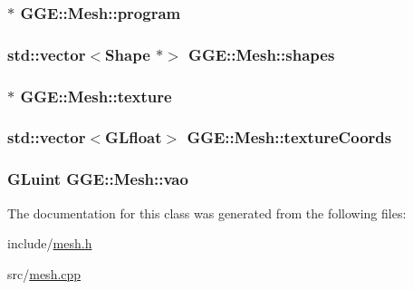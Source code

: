 \hypertarget{class_g_g_e_1_1_mesh_aee3bd238788ee7380e8d6770d5f29f2c}{
\subsubsection[{program}]{$\ast$ G\+G\+E\+::\+Mesh\+::program\hspace{0.3cm}{\ttfamily [private]}}}\label{class_g_g_e_1_1_mesh_aee3bd238788ee7380e8d6770d5f29f2c}
\hypertarget{class_g_g_e_1_1_mesh_a47f9d96f13ba1a491de0bd3c3adb9a76}{
\subsubsection[{shapes}]{\setlength{\rightskip}{0pt plus 5cm}std\+::vector$<${\bf Shape} $\ast$$>$ G\+G\+E\+::\+Mesh\+::shapes\hspace{0.3cm}{\ttfamily [private]}}}\label{class_g_g_e_1_1_mesh_a47f9d96f13ba1a491de0bd3c3adb9a76}
\hypertarget{class_g_g_e_1_1_mesh_acda1261106fd88be1bfc6a9adaa0e7b5}{
\subsubsection[{texture}]{$\ast$ G\+G\+E\+::\+Mesh\+::texture\hspace{0.3cm}{\ttfamily [private]}}}\label{class_g_g_e_1_1_mesh_acda1261106fd88be1bfc6a9adaa0e7b5}
\hypertarget{class_g_g_e_1_1_mesh_a7e48e26708078727065dd68e58846503}{
\subsubsection[{texture\+Coords}]{\setlength{\rightskip}{0pt plus 5cm}std\+::vector$<$G\+Lfloat$>$ G\+G\+E\+::\+Mesh\+::texture\+Coords\hspace{0.3cm}{\ttfamily [private]}}}\label{class_g_g_e_1_1_mesh_a7e48e26708078727065dd68e58846503}
\hypertarget{class_g_g_e_1_1_mesh_a547c5fcf688b6a957c3febd742d51f9f}{
\subsubsection[{vao}]{\setlength{\rightskip}{0pt plus 5cm}G\+Luint G\+G\+E\+::\+Mesh\+::vao\hspace{0.3cm}{\ttfamily [private]}}}\label{class_g_g_e_1_1_mesh_a547c5fcf688b6a957c3febd742d51f9f}


The documentation for this class was generated from the following files\+:\begin{DoxyCompactItemize}
\item 
include/\hyperlink{mesh_8h}{mesh.\+h}\item 
src/\hyperlink{mesh_8cpp}{mesh.\+cpp}\end{DoxyCompactItemize}
